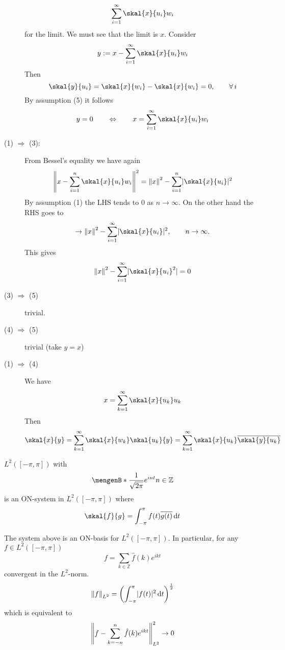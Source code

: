 \begin{beweis}
\begin{description}
		\[
			\sum_{i=1}^{\infty} \skal{x}{u_i}w_i 
		\]
		for the limit. We must see that the limit is $x$. Consider
		\[
			y := x - \sum_{i=1}^{\infty} \skal{x}{u_i}w_i
		\]
		Then 
		\[
			\skal{y}{u_i} = \skal{x}{w_i} - \skal{x}{w_i} = 0, \qquad \forall\, i
		\]
		By assumption (5) it follows 
		\[
			y = 0 \qquad \Leftrightarrow \qquad x = \sum^{\infty}_{i=1} \skal{x}{u_i}w_i
		\]
		\item[(1) $\Rightarrow$ (3):] From Bessel's equality we have again
		\[
			\norm{x- \sum^{n}_{i=1}\skal{x}{u_i}w_i}^2 = \norm{x}^2 - \sum^{n}_{i=1}\abs{\skal{x}{u_i}}^2
		\] 
		By assumption (1) the LHS tends to $0$ as $n \to \infty$. On the other hand the RHS goes to 
		\[
			\to \norm{x}^2 - \sum^{\infty}_{i=1} \abs{\skal{x}{u_i}}^2, \qquad n \to \infty.
		\]
		This gives 
		\[
			\norm{x}^2 - \sum_{i=1}^{\infty} \abs{\skal{x}{u_i}^2} = 0
		\]
		\item[(3) $\Rightarrow $ (5)] trivial.
		\item[(4) $\Rightarrow $ (5)] trivial (take $y=x$)
		\item[(1) $\Rightarrow $ (4)] We have
		\[
			x = \sum_{k=1}^{\infty} \skal{x}{u_k}u_k
		\]
		Then
		\[
			\skal{x}{y} = \sum_{k=1}^{\infty} \skal{x}{w_k}\skal{u_k}{y} = \sum_{k=1}^{\infty}\skal{x}{u_k}\overline{\skal{y}{u_k}}
		\]
 	\end{description}
\end{beweis}

\begin{beispiel}
	$L^2([- \pi, \pi])$ with
	\[
		\set[\frac{1}{\sqrt{2\pi}}e ^{int}]{n \in \mathbb{Z}}
	\]
	is an ON-system in $L^2([-\pi, \pi])$ where
	\[
		\skal{f}{g} = \int_{-\pi}^{\pi} f(t) \overline{g(t)} \,\mathrm{d}t
	\]
\end{beispiel}

\begin{satz}
	The system above is an ON-basis for $L^2([-\pi,\pi])$. In particular, for any $f \in L^2([-\pi,\pi])$
	\[
		f = \sum_{k \in \mathbb{Z}}^{} \hat f(k) e^{ikt}
	\]
	convergent in the $L^2$-norm.
	\[
		\norm{f}_{L^2} = \left( \int_{-\pi}^{\pi} \abs{f(t)}^2 \,\mathrm{d}t \right)^{\frac{1}{2}}
	\]
	which is equivalent to
	\[
		\norm{f - \sum_{k=-n}^{n} \hat f(k) e^{ikt}}^2_{L^2} \to 0
	\]
\end{satz}


